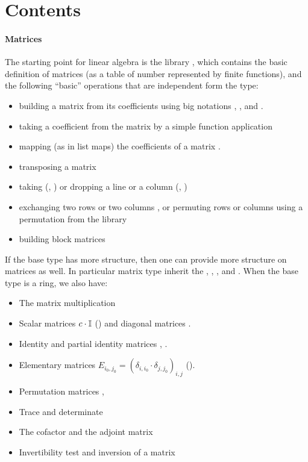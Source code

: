 \section{Contents}

\paragraph{Matrices}

The starting point for linear algebra is the library
, which contains the basic definition of matrices
(as a table of number represented by finite functions), and the
following ``basic'' operations that are independent form the type:
\begin{itemize}
\item building a matrix from its coefficients using big notations
  , ,  and .
\item taking a coefficient from the matrix by a simple function
  application 
\item mapping (as in list maps) the coefficients of a matrix
  .
\item transposing a matrix 
\item taking (, ) or dropping a line or a column
  (, )
\item exchanging two rows  or two columns , or
  permuting rows  or columns  using a
  permutation from the library 
\item building block matrices
\end{itemize}

If the base type has more structure, then one can provide more
structure on matrices as well. In particular matrix type inherit the
, , ,  and
. When the base type is a ring, we also have:
\begin{itemize}
\item The matrix multiplication \C{_ * _}
\item Scalar matrices $c\cdot \mathbb{I}$ () and diagonal matrices
  .
\item Identity  and partial identity matrices ,
  .
\item Elementary matrices
  $E_{i_0,j_0} = \left(\delta_{i,i_0}\cdot\delta_{j,j_0}\right)_{i,j}$
  ().
\item Permutation matrices , 
\item Trace  and determinate 
\item The cofactor  and the adjoint matrix
\item Invertibility test  and inversion of a matrix
\end{itemize}

